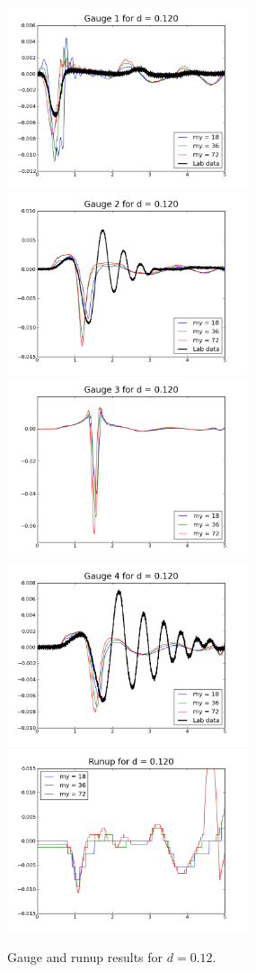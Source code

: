 \begin{figure}[ht]

\hfil\includegraphics[width=2.8in]{bp3/gauge1-d0-12.png}\hfil
\hfil\includegraphics[width=2.8in]{bp3/gauge2-d0-12.png}\hfil
\vskip 10pt
\hfil\includegraphics[width=2.8in]{bp3/gauge3-d0-12.png}\hfil
\hfil\includegraphics[width=2.8in]{bp3/gauge4-d0-12.png}\hfil
\vskip 10pt
\hfil\includegraphics[width=2.8in]{bp3/runup-d0-12.png}\hfil

\caption{\label{fig:bp3gauge4} 
Gauge and runup results for $d=0.12$.
  }
\end{figure}



